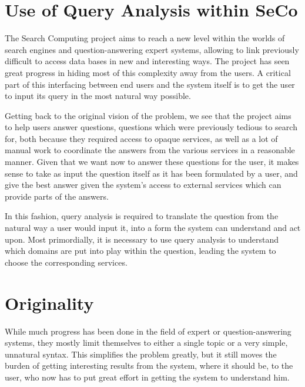

\section{Use of Query Analysis within SeCo} %
\label{sec:use_of_query_analysis_within_seco}

The Search Computing project aims to reach a new level within the worlds of search engines and question-answering expert systems, allowing to link previously difficult to access data bases in new and interesting ways. The project has seen great progress in hiding most of this complexity away from the users. A critical part of this interfacing between end users and the system itself is to get the user to input its query in the most natural way possible.

Getting back to the original vision of the problem, we see that the project aims to help users answer questions, questions which were previously tedious to search for, both because they required access to opaque services, as well as a lot of manual work to coordinate the answers from the various services in a reasonable manner. Given that we want now to answer these questions for the user, it makes sense to take as input the question itself as it has been formulated by a user, and give the best answer given the system's access to external services which can provide parts of the answers.

In this fashion, query analysis is required to translate the question from the natural way a user would input it, into a form the system can understand and act upon. Most primordially, it is necessary to use query analysis to understand which domains are put into play within the question, leading the system to choose the corresponding services.


\section{Originality} %
\label{sec:originality}

While much progress has been done in the field of expert or question-answering systems, they mostly limit themselves to either a single topic or a very simple, unnatural syntax. This simplifies the problem greatly, but it still moves the burden of getting interesting results from the system, where it should be, to the user, who now has to put great effort in getting the system to understand him.

